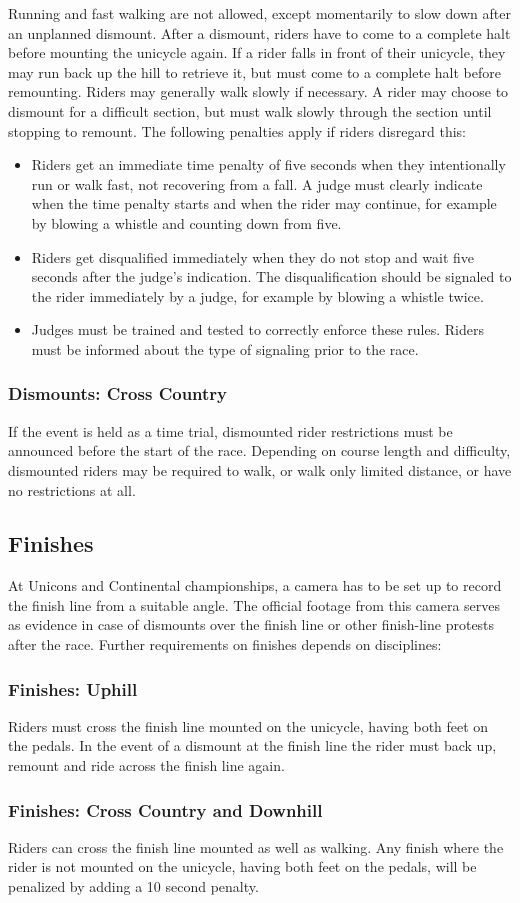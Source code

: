 Running and fast walking are not allowed, except momentarily to slow down after an unplanned dismount.
After a dismount, riders have to come to a complete halt before mounting the unicycle again.
If a rider falls in front of their unicycle, they may run back up the hill to retrieve it, but must come to a complete halt before remounting.
Riders may generally walk slowly if necessary.
A rider may choose to dismount for a difficult section, but must walk slowly through the section until stopping to remount.
The following penalties apply if riders disregard this:
\begin{itemize}
\item Riders get an immediate time penalty of five seconds when they intentionally run or walk fast, not recovering from a fall.
A judge must clearly indicate when the time penalty starts and when the rider may continue, for example by blowing a whistle and counting down from five.
\item Riders get disqualified immediately when they do not stop and wait five seconds after the judge's indication.
The disqualification should be signaled to the rider immediately by a judge, for example by blowing a whistle twice.
\item Judges must be trained and tested to correctly enforce these rules.
Riders must be informed about the type of signaling prior to the race.
\end{itemize}

\subsubsection{Dismounts: Cross Country}

If the event is held as a time trial, dismounted rider restrictions must be announced before the start of the race.
Depending on course length and difficulty, dismounted riders may be required to walk, or walk only limited distance, or have no restrictions at all.

\subsection{Finishes}
At Unicons and Continental championships, a camera has to be set up to record the finish line from a suitable angle.
The official footage from this camera serves as evidence in case of dismounts over the finish line or other finish-line protests after the race.
Further requirements on finishes depends on disciplines:

\subsubsection{Finishes: Uphill}
Riders must cross the finish line mounted on the unicycle, having both feet on the pedals.
In the event of a dismount at the finish line the rider must back up, remount and ride across the finish line again.
\subsubsection{Finishes: Cross Country and Downhill}
Riders can cross the finish line mounted as well as walking. %
Any finish where the rider is not mounted on the unicycle, having both feet on the pedals, will be penalized by adding a 10 second penalty.
